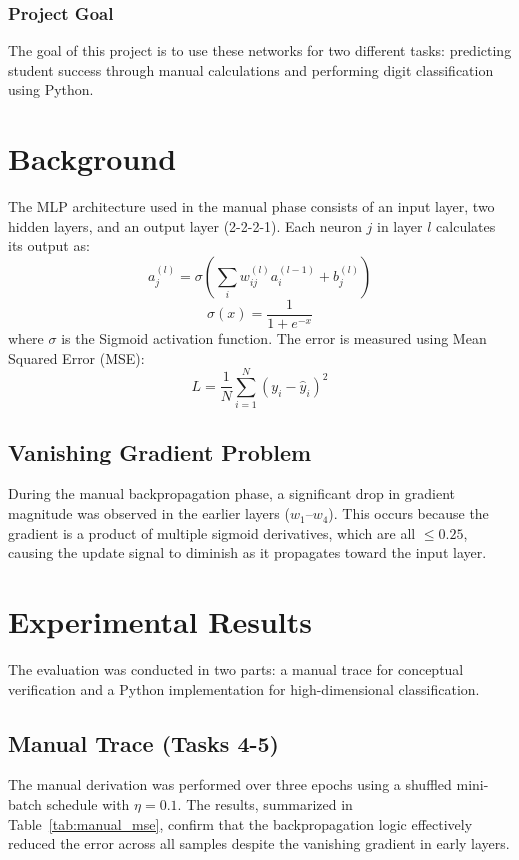 \documentclass[runningheads]{llncs}
\begin{document}
\subsubsection{Project Goal} 
The goal of this project is to use these networks for two different tasks: predicting student success through manual calculations and performing digit classification using Python.
\section{Background}
The MLP architecture used in the manual phase consists of an input layer, two hidden layers, and an output layer (2-2-2-1). Each neuron $j$ in layer $l$ calculates its output as:
\begin{equation}
    a_j^{(l)} = \sigma\left(\sum_{i} w_{ij}^{(l)} a_i^{(l-1)} + b_j^{(l)}\right)
\end{equation}
\begin{equation}
    \sigma(x) = \frac{1}{1 + e^{-x}}
\end{equation}
where $\sigma$ is the Sigmoid activation function. The error is measured using Mean Squared Error (MSE):
\begin{equation}
    L = \frac{1}{N} \sum_{i=1}^{N} (y_i - \hat{y}_i)^2
\end{equation}
\subsection{Vanishing Gradient Problem}
During the manual backpropagation phase, a significant drop in gradient magnitude was observed in the earlier layers ($w_1$–$w_4$). This occurs because the gradient is a product of multiple sigmoid derivatives, which are all $\le 0.25$, causing the update signal to diminish as it propagates toward the input layer.
\section{Experimental Results}
The evaluation was conducted in two parts: a manual trace for conceptual verification and a Python implementation for high-dimensional classification.

\subsection{Manual Trace (Tasks 4-5)}
The manual derivation was performed over three epochs using a shuffled mini-batch schedule with $\eta = 0.1$. The results, summarized in Table~\ref{tab:manual_mse}, confirm that the backpropagation logic effectively reduced the error across all samples despite the vanishing gradient in early layers.
\end{document}
